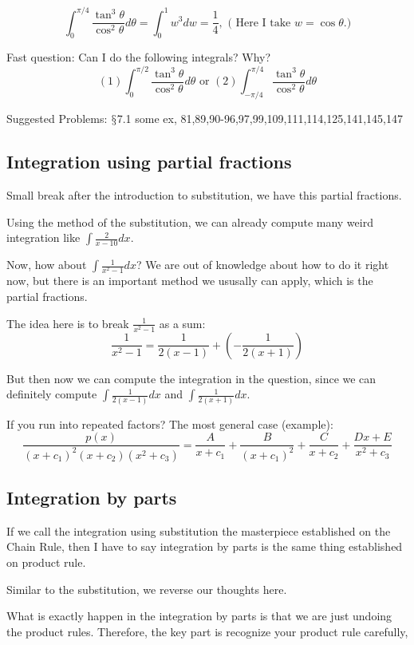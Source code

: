 \documentclass[12pt]{article}
\theoremstyle{definition}
\theoremstyle{definition}
\theoremstyle{remark}
\theoremstyle{definition}
\theoremstyle{definition}
\theoremstyle{definition}
\begin{document}
\[\int_{0}^{\pi/4}\frac{\tan^3 \theta}{\cos^2 \theta}d \theta = \int_{0}^{1}w^3dw=\frac{1}{4},\text{ ( Here I take } w = \cos \theta.)\]

Fast question: Can I do the following integrals? Why?$$(1) \int_{0}^{\pi/2}\frac{\tan^3 \theta}{\cos^2 \theta}d \theta  \text{ or } (2)\int_{-\pi/4}^{\pi/4}\frac{\tan^3 \theta}{\cos^2 \theta}d \theta$$


Suggested Problems: $\mathsection$7.1 some ex, 81,89,90-96,97,99,109,111,114,125,141,145,147


\subsection{Integration using partial fractions}

Small break after the introduction to substitution, we have this partial fractions.

Using the method of the substitution, we can already compute many weird integration like $\int \frac{2}{x-10} dx$.

Now, how about $\int \frac{1}{x^2-1} dx$? We are out of knowledge about how to do it right now, but there is an important method we ususally can apply, which is the partial fractions. 

The idea here is to break $\frac{1}{x^2-1}$ as a sum: $$\frac{1}{x^2-1}=\frac{1}{2(x-1) }+(-\frac{1}{2(x+1)})$$

But then now we can compute the integration in the question, since we can definitely compute $\int \frac{1}{2(x-1) } dx$ and $\int \frac{1}{2(x+1) }dx$.

If you run into repeated factors? The most general case (example): $$\frac{p(x)}{(x+c_1)^2(x+c_2)(x^2+c_3)}=\frac{A}{x+c_1}+\frac{B}{(x+c_1)^2}+\frac{C}{x+c_2}+ \frac{Dx+E}{x^2+c_3}$$

\subsection{Integration by parts}
If we call the integration using substitution the masterpiece established on the Chain Rule, then I have to say integration by parts is the same thing established on product rule.

Similar to the substitution, we reverse our thoughts here.

What is exactly happen in the integration by parts is that we are just undoing the product rules. Therefore, the key part is recognize your product rule carefully, 
\end{document}
